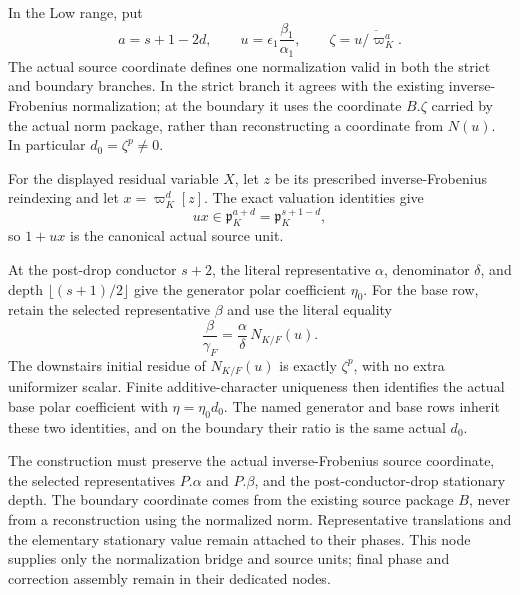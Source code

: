 \begin{theorem}
\label{mod:cases-wildodd-lowsourcenormalization}
In the Low range, put
\[
  a=s+1-2d,\qquad
  u=\epsilon_1\frac{\beta_1}{\alpha_1},\qquad
  \zeta=\overline{u/\varpi_K^a}.
\]
The actual source coordinate defines one normalization valid in both the
strict and boundary branches.  In the strict branch it agrees with the
existing inverse-Frobenius normalization; at the boundary it uses the
coordinate \(B.\zeta\) carried by the actual norm package, rather than
reconstructing a coordinate from \(N(u)\).  In particular
\(d_0=\zeta^p\ne0\).

For the displayed residual variable \(X\), let \(z\) be its prescribed
inverse-Frobenius reindexing and let
\(x=\varpi_K^d[z]\).  The exact valuation identities give
\[
  ux\in\mathfrak p_K^{a+d}
     =\mathfrak p_K^{s+1-d},
\]
so \(1+ux\) is the canonical actual source unit.

At the post-drop conductor \(s+2\), the literal representative
\(\alpha\), denominator \(\delta\), and depth
\(\lfloor(s+1)/2\rfloor\) give the generator polar coefficient
\(\eta_0\).  For the base row, retain the selected representative \(\beta\)
and use the literal equality
\[
  \frac{\beta}{\gamma_F}
    =\frac{\alpha}{\delta}\,N_{K/F}(u).
\]
The downstairs initial residue of \(N_{K/F}(u)\) is exactly \(\zeta^p\),
with no extra uniformizer scalar.  Finite additive-character uniqueness then
identifies the actual base polar coefficient with
\(\eta=\eta_0d_0\).  The named generator and base rows inherit these two
identities, and on the boundary their ratio is the same actual \(d_0\).

\leanok
{}
\FormalizationContract
The construction must preserve the actual inverse-Frobenius source
coordinate, the selected representatives \(P.\alpha\) and \(P.\beta\), and
the post-conductor-drop stationary depth.  The boundary coordinate comes
from the existing source package \(B\), never from a reconstruction using
the normalized norm.  Representative translations and the elementary
stationary value remain attached to their phases.  This node supplies only
the normalization bridge and source units; final phase and correction
assembly remain in their dedicated nodes.
\end{theorem}
